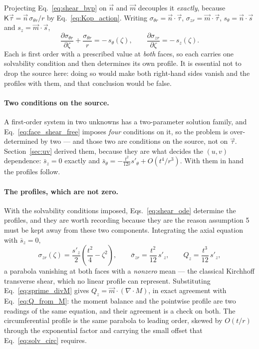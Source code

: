 \documentclass[11pt]{article}
\begin{document}
Projecting Eq.~\eqref{eq:shear_bvp} on $\vec n$ and $\vec m$ decouples it
\emph{exactly}, because $\mathsf K\vec\tau = \vec n\,\sigma_{\theta r}/r$ by
Eq.~\eqref{eq:Kop_action}. Writing
$\sigma_{\theta r} = \vec n\cdot\vec\tau$,
$\sigma_{zr} = \vec m\cdot\vec\tau$,
$s_\theta = \vec n\cdot\vec s$ and $s_z = \vec m\cdot\vec s$,
\begin{equation}\label{eq:shear_ode}
    \boxed{\;\frac{\partial \sigma_{\theta r}}{\partial \zeta}
      + \frac{\sigma_{\theta r}}{r} = -\,s_\theta\left(\zeta\right),
    \qquad
    \frac{\partial \sigma_{z r}}{\partial \zeta}
      = -\,s_z\left(\zeta\right).\;}
\end{equation}
Each is first order with a prescribed value at \emph{both} faces, so each carries
one solvability condition and then determines its own profile. It is essential
not to drop the source here: doing so would make both right-hand sides vanish and
the profiles with them, and that conclusion would be false.

\paragraph{Two conditions on the source.} A first-order system in two unknowns
has a two-parameter solution family, and Eq.~\eqref{eq:face_shear_free} imposes
\emph{four} conditions on it, so the problem is over-determined by two --- and
those two are conditions on the source, not on $\vec\tau$.
Section~\ref{sec:uv} derived them, because they are what decides the
$\left(u,v\right)$ dependence: $\bar s_z = 0$ exactly and
$\bar s_\theta = -\frac{t^{2}}{12 r}s'_\theta + O\!\left(t^{4}/r^{3}\right)$.
With them in hand the profiles follow.

\paragraph{The profiles, which are not zero.} With the solvability conditions
imposed, Eqs.~\eqref{eq:shear_ode} determine the profiles, and they are worth
recording because they are the reason assumption 5 must be kept away from these
two components. Integrating the axial equation with $\bar s_z = 0$,
\begin{equation}\label{eq:shear_profile}
    \boxed{\;\sigma_{zr}\left(\zeta\right)
      = \frac{s'_z}{2}\left(\frac{t^{2}}{4} - \zeta^{2}\right),
    \qquad
    \bar\sigma_{zr} = \frac{t^{2}}{12}\,s'_z,
    \qquad
    Q_{z} = \frac{t^{3}}{12}\,s'_z,\;}
\end{equation}
a parabola vanishing at both faces with a \emph{nonzero} mean --- the classical
Kirchhoff transverse shear, which no linear profile can represent. Substituting
Eq.~\eqref{eq:sprime_divM} gives
$Q_z = \vec m\cdot\left(\nabla\cdot M\right)$, in exact agreement with
Eq.~\eqref{eq:Q_from_M}: the moment balance and the pointwise profile are two
readings of the same equation, and their agreement is a check on both. The
circumferential profile is the same parabola to leading order, skewed by
$O\!\left(t/r\right)$ through the exponential factor and carrying the small
offset that Eq.~\eqref{eq:solv_circ} requires.
\end{document}
